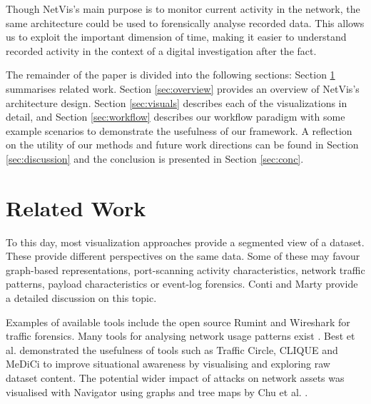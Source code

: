 Though NetVis's main purpose is to monitor current activity in the network, the same
architecture could be used to forensically analyse recorded data. This allows us to exploit the
important dimension of time, making it easier to understand recorded activity in the context of a
digital investigation after the fact.

The remainder of the paper is divided into the following sections: Section \ref{sec:relatedwork}
summarises related work. Section \ref{sec:overview} provides an overview of NetVis's architecture
design. Section \ref{sec:visuals} describes each of the visualizations in detail, and Section
\ref{sec:workflow} describes our workflow paradigm with some example scenarios to demonstrate the
usefulness of our framework. A reflection on the utility of our methods and future work directions
can be found in Section \ref{sec:discussion} and the conclusion is presented in Section \ref{sec:conc}.

\section{Related Work} \label{sec:relatedwork}
%
To this day, most visualization approaches provide a segmented view of a dataset. These 
provide different perspectives on the same data. Some of these may favour graph-based 
representations, port-scanning activity characteristics, network traffic patterns, payload 
characteristics or event-log forensics. Conti \cite{Conti} and Marty \cite{marty2009applied} 
provide a detailed discussion on this topic.

Examples of available tools include the open source Rumint \cite{rumint} and Wireshark
\cite{wireshark} for traffic forensics. Many tools for analysing network usage patterns
exist \cite{RADAR, plonka2000flowscan, lau2004spinning, best2010, liao2010}. Best et al.
\cite{best2010} demonstrated the usefulness of tools such as Traffic Circle, CLIQUE and MeDiCi to
improve situational awareness by visualising and exploring raw dataset content. The potential wider
impact of attacks on network assets was visualised with Navigator using graphs and tree maps by Chu
et al. \cite{chu2010}. 


